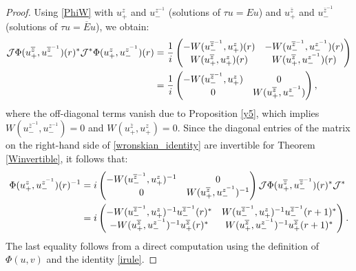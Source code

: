 \documentclass[12pt,oneside,onecolumn,open]{article}
\begin{document}
\begin{proof}
    Using \eqref{PhiW} with $u_+^z$ and $u_-^{z^{-1}}$ (solutions of $\tau u = Eu $) and $u_+^{\overline{z}}$ and $u_-^{\overline{z}^{-1}}$ (solutions of $\tau u = \overline{E}u $), we obtain:
    \begin{align}\label{wronskian_identity}
        \mathcal{J}\Phi(u_+^{\overline{z}}, u_-^{\overline{z}^{-1}})(r)^*\mathcal{J}^*\Phi(u_+^z, u_-^{z^{-1}})(r) 
        &\notag = \frac{1}{i}
        \begin{pmatrix}
            -W(u_-^{\overline{z}^{-1}}, u_+^z)(r) & -W(u_-^{\overline{z}^{-1}}, u_-^{z^{-1}})(r) \\
            W(u_+^{\overline{z}}, u_+^z)(r) & W(u_+^{\overline{z}}, u_-^{z^{-1}})(r)
        \end{pmatrix} \\
        & = \frac{1}{i}
        \begin{pmatrix}
            -W(u_-^{\overline{z}^{-1}}, u_+^z) & 0 \\
            0 & W(u_+^{\overline{z}}, u_-^{z^{-1}})
        \end{pmatrix},
    \end{align}
    where the off-diagonal terms vanish due to Proposition \ref{y5}, which implies $W(u_-^{\overline{z}^{-1}}, u_-^{z^{-1}}) = 0$ and $W(u_+^{\overline{z}}, u_+^z) = 0$. Since the diagonal entries of the matrix on the right-hand side of \eqref{wronskian_identity} are invertible for Theorem \ref{Winvertible}, it follows that:
    \begin{align}
        \Phi(u_+^z, u_-^{z^{-1}})(r)^{-1} &\notag = i
        \begin{pmatrix}
            -W(u_-^{\overline{z}^{-1}}, u_+^z)^{-1} & 0 \\
            0 & W(u_+^{\overline{z}}, u_-^{z^{-1}})^{-1}
        \end{pmatrix}
        \mathcal{J}\Phi(u_+^{\overline{z}}, u_-^{\overline{z}^{-1}})(r)^*\mathcal{J}^* \\
        & = i
        \begin{pmatrix}
            -W(u_-^{\overline{z}^{-1}}, u_+^z)^{-1} u_-^{\overline{z}^{-1}}(r)^* 
            & W(u_-^{\overline{z}^{-1}}, u_+^z)^{-1} u_-^{\overline{z}^{-1}}(r +1 )^* \\
            -W(u_+^{\overline{z}}, u_-^{z^{-1}})^{-1} u_+^{\overline{z}}(r)^* 
            & W(u_+^{\overline{z}}, u_-^{z^{-1}})^{-1} u_+^{\overline{z}}(r+1 )^*
        \end{pmatrix}.
    \end{align}
    The last equality follows from a direct computation using the definition of $\Phi(u, v)$ and the identity \eqref{irule}.
\end{proof}
\end{document}
